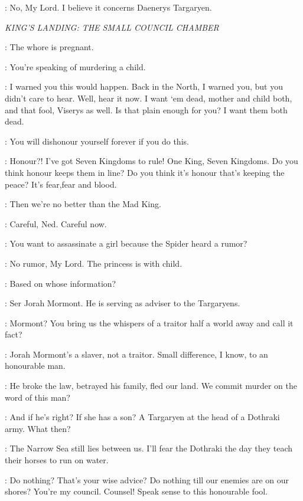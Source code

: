 \STEWARD: No, My Lord. I believe it concerns Daenerys Targaryen. 


\scene

\textit{KING'S LANDING: THE SMALL COUNCIL CHAMBER} 


\ROBERT: The whore is pregnant. 

\NED: You're speaking of murdering a child. 

\ROBERT: I warned you this would happen. Back in the North, I warned you, but you didn't care to hear. Well, hear it now. I want `em dead, mother and child both, and that fool, Viserys as well. Is that plain enough for you? I want them both dead. 

\NED: You will dishonour yourself forever if you do this. 

\ROBERT: Honour?! I've got Seven Kingdoms to rule! One King, Seven Kingdoms. Do you think honour keeps them in line? Do you think it's honour that's keeping the peace? It's fear,fear and blood. 

\NED: Then we're no better than the Mad King. 

\ROBERT: Careful, Ned. Careful now. 

\NED: You want to assassinate a girl because the Spider heard a rumor? 

\VARYS: No rumor, My Lord. The princess is with child. 

\NED: Based on whose information? 

\VARYS: Ser Jorah Mormont. He is serving as adviser to the Targaryens. 

\NED: Mormont? You bring us the whispers of a traitor half a world away and call it fact? 

\LITTLEFINGER: Jorah Mormont's a slaver, not a traitor. Small difference, I know, to an honourable man. 

\NED: He broke the law, betrayed his family, fled our land. We commit murder on the word of this man? 

\ROBERT: And if he's right? If she has a son? A Targaryen at the head of a Dothraki army. What then? 

\NED: The Narrow Sea still lies between us. I'll fear the Dothraki the day they teach their horses to run on water. 

\ROBERT: Do nothing? That's your wise advice? Do nothing till our enemies are on our shores? You're my council. Counsel! Speak sense to this honourable fool. 

